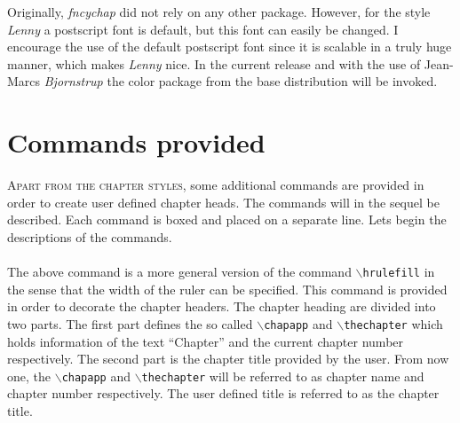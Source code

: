 \documentclass{report}
\newcommand{\sk}{\vspace{0.2 cm}}
\newcommand{\A}[1]{{$\backslash$\texttt{#1}}}
\newcommand{\nsp}{\mbox{\hspace{-1 cm}}}
\begin{document}
    Originally, \textsl{fncychap} did not rely on any other package.
    However, for the style {\em Lenny} a postscript font is default,
    but this font can easily be changed. I encourage the use of the
    default postscript font since it is scalable in a truly huge manner,
    which makes {\em Lenny} nice. In the current release and with the use of
    Jean-Marcs \textsl{Bjornstrup} the color package from the base
    distribution will be invoked.
    
  \chapter{Commands provided}
  \lettrine{A}{part from the chapter styles}, some additional commands are
  provided in order to create user defined chapter heads. The commands
  will in the sequel be described. Each command is boxed and placed on
  a separate line. Lets begin the descriptions of the commands.\sk\\ 
  \nsp\fbox{\A{mghrulefill}\{{\em width}\}}\sk\\
  The above command is a more general version of the command
  \A{hrulefill} in the sense that the width of the ruler can be
  specified. This command is provided in order to decorate the chapter
  headers. The chapter heading are divided into two parts. The first
  part defines the so called \A{chapapp} and \A{thechapter} which
  holds information of the text ``Chapter'' and the current chapter number
  respectively. The second part is the chapter title provided by the
  user. From now one, the \A{chapapp} and \A{thechapter} will be
  referred to as chapter name and chapter number respectively. The
  user defined title is referred to as the chapter title.
\end{document}
